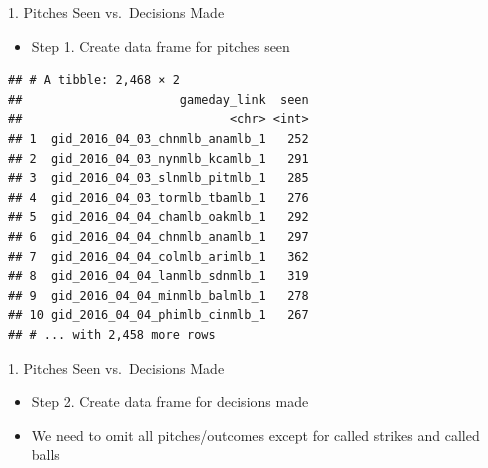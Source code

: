 \documentclass[14pt,ignorenonframetext,aspectratio = 1610]{beamer}
\newenvironment{Shaded}{\begin{snugshade}}{\end{snugshade}}
\newcommand{\KeywordTok}[1]{\textcolor[rgb]{0.13,0.29,0.53}{\textbf{{#1}}}}
\newcommand{\DataTypeTok}[1]{\textcolor[rgb]{0.13,0.29,0.53}{{#1}}}
\newcommand{\StringTok}[1]{\textcolor[rgb]{0.31,0.60,0.02}{{#1}}}
\newcommand{\NormalTok}[1]{{#1}}
\providecommand{\tightlist}{%
\setlength{\itemsep}{0pt}\setlength{\parskip}{0pt}}
\begin{document}
\begin{frame}[fragile]{1. Pitches Seen vs.~Decisions Made}

\begin{itemize}
\tightlist
\item
  Step 1. Create data frame for pitches seen
\end{itemize}

\footnotesize

\begin{Shaded}
\end{Shaded}

\begin{verbatim}
## # A tibble: 2,468 × 2
##                      gameday_link  seen
##                             <chr> <int>
## 1  gid_2016_04_03_chnmlb_anamlb_1   252
## 2  gid_2016_04_03_nynmlb_kcamlb_1   291
## 3  gid_2016_04_03_slnmlb_pitmlb_1   285
## 4  gid_2016_04_03_tormlb_tbamlb_1   276
## 5  gid_2016_04_04_chamlb_oakmlb_1   292
## 6  gid_2016_04_04_chnmlb_anamlb_1   297
## 7  gid_2016_04_04_colmlb_arimlb_1   362
## 8  gid_2016_04_04_lanmlb_sdnmlb_1   319
## 9  gid_2016_04_04_minmlb_balmlb_1   278
## 10 gid_2016_04_04_phimlb_cinmlb_1   267
## # ... with 2,458 more rows
\end{verbatim}

\end{frame}

\begin{frame}[fragile]{1. Pitches Seen vs.~Decisions Made}

\begin{itemize}
\tightlist
\item
  Step 2. Create data frame for decisions made
\item
  We need to omit all pitches/outcomes except for called strikes and
  called balls
\end{itemize}

\footnotesize

\begin{Shaded}
\end{Shaded}

\end{frame}
\end{document}
